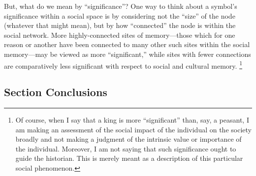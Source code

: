 But, what do we mean by ``significance''? One way to think about a symbol's significance within a social space is by considering not the ``size'' of the node (whatever that might mean), but by how ``connected'' the node is within the social network. More highly-connected sites of memory---those which for one reason or another have been connected to many other such sites within the social memory---may be viewed as more ``significant,'' while sites with fewer connections are comparatively less significant with respect to social and cultural memory.%
    \footnote{Of course, when I say that a king is more ``significant'' than, say, a peasant, I am making an assessment of the social impact of the individual on the society broadly and not making a judgment of the intrinsic value or importance of the individual. Moreover, I am not saying that such significance ought to guide the historian. This is merely meant as a description of this particular social phenomenon.}



\subsection*{Section Conclusions}
